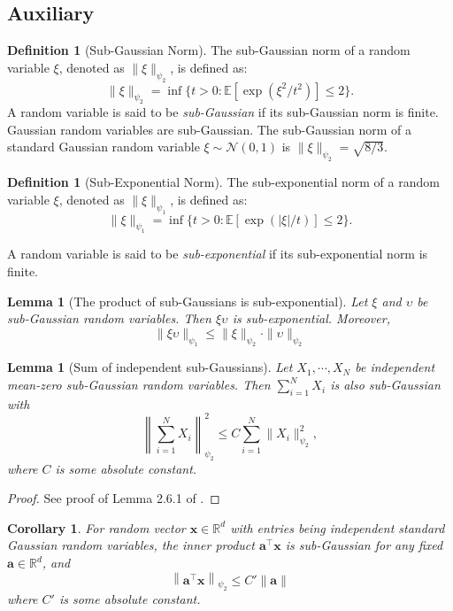 \documentclass{article}
\theoremstyle{plain}
\newtheorem{lemma}[theorem]{Lemma}
\newtheorem{corollary}[theorem]{Corollary}
\theoremstyle{definition}
\newtheorem{definition}[theorem]{Definition}
\theoremstyle{remark}
\begin{document}
\subsection{Auxiliary}

\begin{definition}[Sub-Gaussian Norm]
    The sub-Gaussian norm of a random variable $\xi $, denoted as $ \|\xi\|_{\psi_2} $, is defined as:
\[
\|\xi\|_{\psi_2} = \inf \{ t > 0 : \mathbb{E}[\exp(\xi^2 / t^2)] \leq 2 \}.
\]
A random variable is said to be \textit{sub-Gaussian} if its sub-Gaussian norm is finite. Gaussian random variables are sub-Gaussian. The sub-Gaussian norm of a standard Gaussian random variable $\xi \sim \mathcal N(0,1)$ is $\| \xi \|_{\psi_2} = \sqrt{8/3}$.
\end{definition}

\begin{definition}[Sub-Exponential Norm]
    The sub-exponential norm of a random variable \( \xi \), denoted as \( \|\xi\|_{\psi_1} \), is defined as:
\[
\|\xi\|_{\psi_1} = \inf \{ t > 0 : \mathbb{E}[\exp(|\xi| / t)] \leq 2 \}.
\]
\end{definition}

A random variable is said to be \textit{sub-exponential} if its sub-exponential norm is finite.

\begin{lemma}[The product of sub-Gaussians is sub-exponential] \label{lemma:sub-exp-sub-gau}
    Let $\xi$ and $\upsilon$ be sub-Gaussian random variables. Then $\xi \upsilon$ is sub-exponential. Moreover, 
    \[
    \| \xi \upsilon \|_{\psi_1} \leq \| \xi \|_{\psi_2} \cdot \| \upsilon \|_{\psi_2}
    \]
\end{lemma}

\begin{lemma}[Sum of independent sub-Gaussians] \label{lemma:sum-indep-sub-gau}
    Let $X_1,\cdots, X_N$ be independent mean-zero sub-Gaussian random variables. Then $\sum_{i=1}^N X_i$ is also sub-Gaussian with 
    \[
    \left\| \sum_{i=1}^N X_i \right\|^2_{\psi_2} \le C \sum_{i=1}^N \|X_i\|^2_{\psi_2} ,
    \]
    where $C$ is some absolute constant. 
\end{lemma}
\begin{proof}
    See proof of Lemma 2.6.1 of \cite{vershynin2018high}.
\end{proof}

\begin{corollary}\label{cor:inn-prod-sub-gau}
    For random vector $\mathbf x\in \mathbb R^d$ with entries being independent standard Gaussian random variables, the inner product $\mathbf a^\top \mathbf x$ is sub-Gaussian for any fixed $\mathbf a \in \mathbb R^d$, and 
    \[
    \left\| \mathbf a^\top \mathbf x \right\|_{\psi_2} \le C'\|\mathbf a\|
    \]
    where $C'$ is some absolute constant.
\end{corollary}
\end{document}

